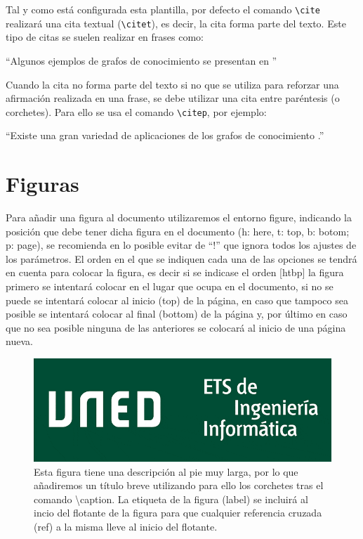 Tal y como está configurada esta plantilla, por defecto el comando \verb|\cite| realizará una cita textual (\verb|\citet|), es decir, la cita forma parte del texto. Este tipo de citas se suelen realizar en frases como: 

``Algunos ejemplos de grafos de conocimiento se presentan en \citet{ji2020survey}'' 

Cuando la cita no forma parte del texto si no que se utiliza para reforzar una afirmación realizada en una frase, se debe utilizar una cita entre paréntesis (o corchetes). Para ello se usa el comando \verb|\citep|, por ejemplo:

``Existe una gran variedad de aplicaciones de los grafos de conocimiento \citep{ji2020survey}.''


\section{Figuras}
Para añadir una figura al documento utilizaremos el entorno figure, indicando la posición que debe tener dicha figura en el documento (h: here, t: top, b: botom; p: page), se recomienda en lo posible evitar de ``!'' que ignora todos los ajustes de los parámetros. El orden en el que se indiquen cada una de las opciones se tendrá en cuenta para colocar la figura, es decir si se indicase el orden [htbp] la figura primero se intentará colocar en el lugar que ocupa en el documento, si no se puede se intentará colocar al inicio (top) de la página, en caso que tampoco sea posible se intentará colocar al final (bottom) de la página y, por último en caso que no sea posible ninguna de las anteriores se colocará al inicio de una página nueva.

\begin{figure}[ht]
\begin{centering}
\includegraphics[width=0.5\columnwidth]{images/logo_informatica.png}
\par\end{centering}

\caption[Ejemplo de figura]{Esta figura tiene una descripción al pie muy larga, por lo que añadiremos un título breve utilizando para ello los corchetes tras el comando \textbackslash caption. La etiqueta de la figura (label) se incluirá al incio del flotante de la figura para que cualquier referencia cruzada (ref) a la misma lleve al inicio del flotante.\label{fig:Ejemplo-de-figura}}
\end{figure}

